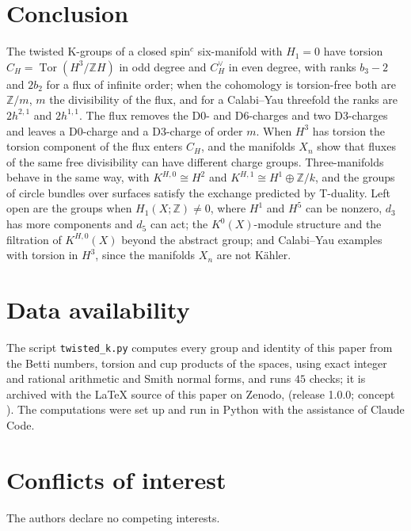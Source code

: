 \documentclass[reqno,11pt]{amsart}
\theoremstyle{definition}
\newcommand{\ZZ}{\mathbb{Z}}
\DeclareMathOperator{\Tor}{Tor}
\begin{document}
\section{Conclusion}\label{sec:conclusion}

The twisted K-groups of a closed spin$^c$ six-manifold with $H_1=0$ have torsion $C_H=\Tor(H^3/\ZZ H)$ in odd degree and $C_H^\vee$ in even degree, with ranks $b_3-2$ and $2b_2$ for a flux of infinite order; when the cohomology is torsion-free both are $\ZZ/m$, $m$ the divisibility of the flux, and for a Calabi--Yau threefold the ranks are $2h^{2,1}$ and $2h^{1,1}$. The flux removes the D0- and D6-charges and two D3-charges and leaves a D0-charge and a D3-charge of order $m$. When $H^3$ has torsion the torsion component of the flux enters $C_H$, and the manifolds $X_n$ show that fluxes of the same free divisibility can have different charge groups. Three-manifolds behave in the same way, with $K^{H,0}\cong H^2$ and $K^{H,1}\cong H^1\oplus\ZZ/k$, and the groups of circle bundles over surfaces satisfy the exchange predicted by T-duality. Left open are the groups when $H_1(X;\ZZ)\neq0$, where $H^1$ and $H^5$ can be nonzero, $d_3$ has more components and $d_5$ can act; the $K^0(X)$-module structure and the filtration of $K^{H,0}(X)$ beyond the abstract group; and Calabi--Yau examples with torsion in $H^3$, since the manifolds $X_n$ are not K\"ahler.

\section*{Data availability}
The script \texttt{twisted\_k.py} computes every group and identity of this paper from the Betti numbers, torsion and cup products of the spaces, using exact integer and rational arithmetic and Smith normal forms, and runs $45$ checks; it is archived with the LaTeX source of this paper on Zenodo,  (release 1.0.0; concept ). The computations were set up and run in Python with the assistance of Claude Code.

\section*{Conflicts of interest}
The authors declare no competing interests.

\appendix
\end{document}
